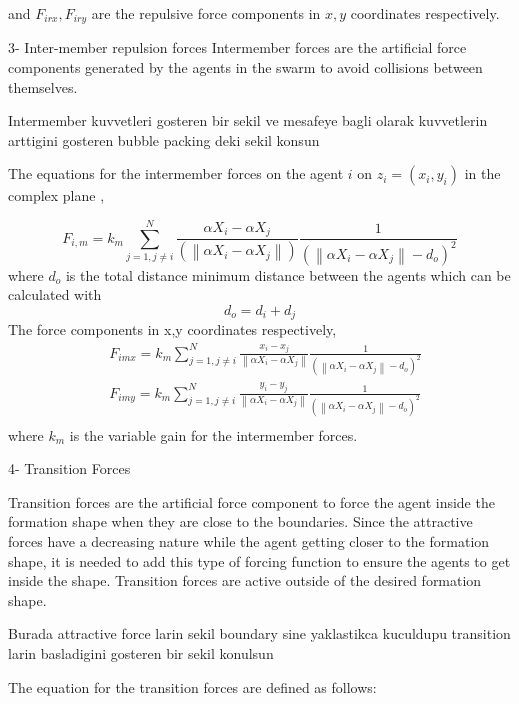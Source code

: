 \documentclass[twoside]{article}
\newcommand{\norm}[1]{\left\lVert#1\right\rVert}
\begin{document}
						and $F_{irx} , F_{iry} $ are the repulsive force components in $x,y$ coordinates respectively.
						
			
			3- Inter-member repulsion forces
			Intermember forces are the artificial force components generated by the agents in the swarm to avoid collisions between themselves. 
			
			Intermember kuvvetleri gosteren bir sekil ve mesafeye bagli olarak kuvvetlerin arttigini gosteren bubble packing deki sekil konsun
			
			The equations for the intermember forces on the agent $i$ on $z_i = (x_i, y_i)$  in the complex plane ,
			
			\begin{equation}
F_{i,m} = k_m \sum_{j=1, j\neq i}^{N}\frac{\alpha X_i - \alpha X_j}{(\norm{\alpha X_i - \alpha X_j})} \frac{1}{(\norm{\alpha X_i - \alpha X_j} - d_o)^2}
			\end{equation}
			where $d_o$ is the total distance minimum distance between the agents which can be calculated with
			\begin{equation}
 d_o = d_i + d_j
			\end{equation}
			The force components in x,y coordinates respectively,
			\begin{align*}
&F_{imx} = k_m \sum_{j=1, j\neq i}^{N}\frac{x_i- x_j}{\norm{\alpha X_i - \alpha X_j}}  \frac{1}{(\norm{\alpha X_i - \alpha X_j} - d_o)^2}\\
&F_{imy} = k_m \sum_{j=1, j\neq i}^{N}\frac{y_i- y_j}{\norm{\alpha X_i - \alpha X_j}}  \frac{1}{(\norm{\alpha X_i - \alpha X_j} - d_o)^2}\\
			\end{align*}
			where $k_m$ is the variable gain for the intermember forces. 
			
			
			4- Transition Forces
			
			Transition forces are the artificial force component to force the agent inside the formation shape when they are close to the boundaries. Since the attractive forces have a decreasing nature while the agent getting closer to the formation shape, it is needed to add this type of forcing function to ensure the agents to get inside the shape. Transition forces are active outside of the desired formation shape.
			
			Burada attractive force larin sekil boundary sine yaklastikca kuculdupu transition larin basladigini gosteren bir sekil konulsun
			
				The equation for the transition forces are defined as follows:	
				
\end{document}
